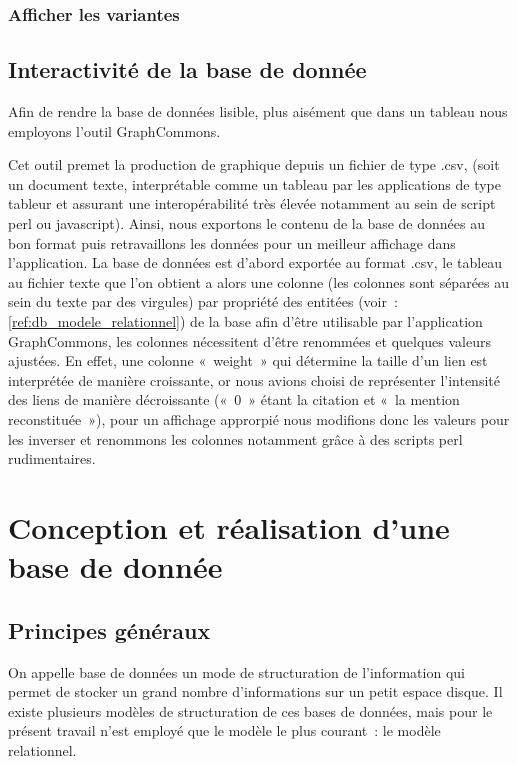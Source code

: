 \documentclass[12pt, a4paper]{article}
\begin{document}

\subsubsection{Afficher les variantes}


    \subsection{Interactivité de la base de donnée}


Afin de rendre la base de données lisible, plus aisément que dans un tableau nous employons l'outil GraphCommons.

Cet outil premet la production de graphique depuis un fichier de type .csv, (soit un document texte, interprétable comme un tableau par les applications de type tableur et assurant une interopérabilité très élevée notamment au sein de script perl ou javascript). Ainsi, nous exportons le contenu de la base de données au bon format puis retravaillons les données pour un meilleur affichage dans l'application.
La base de données est d'abord exportée au format .csv, le tableau au fichier texte que l'on obtient a alors une colonne (les colonnes sont séparées au sein du texte par des virgules) par propriété des entitées (voir~: \ref{ref:db_modele_relationnel}) de la base afin d'être utilisable par l'application GraphCommons, les colonnes nécessitent d'être renommées et quelques valeurs ajustées. En effet, une colonne «~weight~» qui détermine la taille d'un lien est interprétée de manière croissante, or nous avions choisi de représenter l'intensité des liens de manière décroissante («~0~» étant la citation et «~la mention reconstituée~»), pour un affichage approrpié nous modifions donc les valeurs pour les inverser et renommons les colonnes notamment grâce à des scripts perl rudimentaires.





\section{Conception et réalisation d'une base de donnée}
    \subsection{Principes généraux}
    On appelle base de données un mode de structuration de l'information qui permet de stocker un grand nombre d'informations sur un petit espace disque. Il existe plusieurs modèles de structuration de ces bases de données, mais pour le présent travail n'est employé que le modèle le plus courant~: le modèle relationnel.
\end{document}
